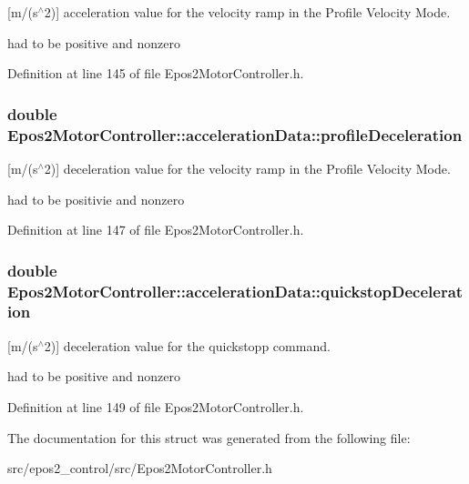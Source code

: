 \mbox{[}m/(s$^\wedge$2)\mbox{]} acceleration value for the velocity ramp in the Profile Velocity Mode. 

had to be positive and nonzero 

Definition at line 145 of file Epos2\-Motor\-Controller.\-h.

\hypertarget{structEpos2MotorController_1_1accelerationData_a72c9997dab624335001a0546dfd6da99}{
\subsubsection[{profile\-Deceleration}]{\setlength{\rightskip}{0pt plus 5cm}double Epos2\-Motor\-Controller\-::acceleration\-Data\-::profile\-Deceleration}}\label{structEpos2MotorController_1_1accelerationData_a72c9997dab624335001a0546dfd6da99}


\mbox{[}m/(s$^\wedge$2)\mbox{]} deceleration value for the velocity ramp in the Profile Velocity Mode. 

had to be positivie and nonzero 

Definition at line 147 of file Epos2\-Motor\-Controller.\-h.

\hypertarget{structEpos2MotorController_1_1accelerationData_a50eb2056942ec96cbfc7e67e3e04f5ef}{
\subsubsection[{quickstop\-Deceleration}]{\setlength{\rightskip}{0pt plus 5cm}double Epos2\-Motor\-Controller\-::acceleration\-Data\-::quickstop\-Deceleration}}\label{structEpos2MotorController_1_1accelerationData_a50eb2056942ec96cbfc7e67e3e04f5ef}


\mbox{[}m/(s$^\wedge$2)\mbox{]} deceleration value for the quickstopp command. 

had to be positive and nonzero 

Definition at line 149 of file Epos2\-Motor\-Controller.\-h.



The documentation for this struct was generated from the following file\-:\begin{DoxyCompactItemize}
\item 
src/epos2\-\_\-control/src/Epos2\-Motor\-Controller.\-h\end{DoxyCompactItemize}
